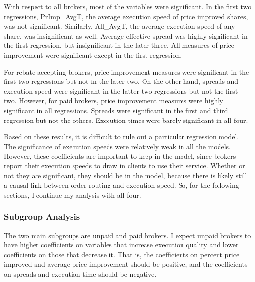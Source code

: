 \documentclass[12pt,a4paper]{article}
\begin{document}
		With respect to all brokers, most of the variables were significant. In the first two regressions, PrImp\_AvgT, the average execution speed of price improved shares, was not significant. Similarly, All\_AvgT, the average execution speed of any share, was insignificant as well. Average effective spread was highly significant in the first regression, but insignificant in the later three. All measures of price improvement were significant except in the first regression.
		
		For rebate-accepting brokers, price improvement measures were significant in the first two regressions but not in the later two. On the other hand, spreads and execution speed were significant in the latter two regressions but not the first two. However, for paid brokers, price improvement measures were highly significant in all regressions. Spreads were significant in the first and third regression but not the others. Execution times were barely significant in all four. 
		
		Based on these results, it is difficult to rule out a particular regression model. The significance of execution speeds were relatively weak in all the models. However, these coefficients are important to keep in the model, since brokers report their execution speeds to draw in clients to use their service. Whether or not they are significant, they should be in the model, because there is likely still a causal link between order routing and execution speed. So, for the following sections, I continue my analysis with all four. 
	
		\subsubsection{Subgroup Analysis}
		
		The two main subgroups are unpaid and paid brokers. I expect unpaid brokers to have higher coefficients on variables that increase execution quality and lower coefficients on those that decrease it. That is, the coefficients on percent price improved and average price improvement should be positive, and the coefficients on spreads and execution time should be negative. 
		
\end{document}
